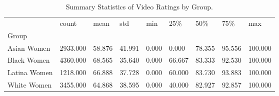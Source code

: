 \begin{table}[htbp]
\centering
\caption{Summary Statistics of Video Ratings by Group.}
\label{tab:rating-stats}
\begin{tabular}{lllllllll}
\toprule
 & count & mean & std & min & 25\% & 50\% & 75\% & max \\
Group &  &  &  &  &  &  &  &  \\
\midrule
Asian Women & 2933.000 & 58.876 & 41.991 & 0.000 & 0.000 & 78.355 & 95.556 & 100.000 \\
Black Women & 4360.000 & 68.565 & 35.640 & 0.000 & 66.667 & 83.333 & 92.530 & 100.000 \\
Latina Women & 1218.000 & 66.888 & 37.728 & 0.000 & 60.000 & 83.730 & 93.883 & 100.000 \\
White Women & 3455.000 & 64.868 & 38.595 & 0.000 & 40.000 & 82.927 & 92.857 & 100.000 \\
\bottomrule
\end{tabular}

\end{table}